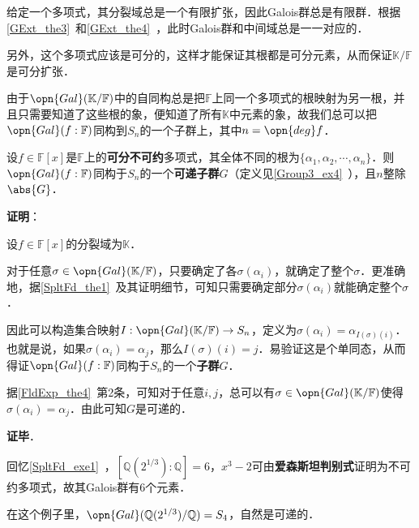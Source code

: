 给定一个多项式，其分裂域总是一个有限扩张，因此Galois群总是有限群．根据\autoref{GExt_the3}~和\autoref{GExt_the4}~，此时Galois群和中间域总是一一对应的．

另外，这个多项式应该是可分的，这样才能保证其根都是可分元素，从而保证$\mathbb{K}/\mathbb{F}$是可分扩张．

由于$\opn{Gal}(\mathbb{K}/\mathbb{F})$中的自同构总是把$\mathbb{F}$上同一个多项式的根映射为另一根，并且只需要知道了这些根的象，便知道了所有$\mathbb{K}$中元素的象，故我们总可以把$\opn{Gal}(f:\mathbb{F})$同构到$S_n$的一个子群上，其中$n=\opn{deg}f$．

\begin{theorem}{}\label{PlyRtS_the1}
设$f\in\mathbb{F}[x]$是$\mathbb{F}$上的\textbf{可分不可约}多项式，其全体不同的根为$\{\alpha_1, \alpha_2, \cdots, \alpha_n\}$．则$\opn{Gal}(f:\mathbb{F})$同构于$S_n$的一个\textbf{可递子群}$G$（定义见\autoref{Group3_ex4}~），且$n$整除$\abs{G}$．
\end{theorem}

\textbf{证明}：

设$f\in\mathbb{F}[x]$的分裂域为$\mathbb{K}$．

对于任意$\sigma\in\opn{Gal}(\mathbb{K}/\mathbb{F})$，只要确定了各$\sigma(\alpha_i)$，就确定了整个$\sigma$．更准确地，据\autoref{SpltFd_the1}~及其证明细节，可知只需要确定部分$\sigma(\alpha_i)$就能确定整个$\sigma$．

因此可以构造集合映射$I:\opn{Gal}(\mathbb{K}/\mathbb{F})\to S_n$，定义为$\sigma(\alpha_i)=\alpha_{I(\sigma)(i)}$．也就是说，如果$\sigma(\alpha_i)=\alpha_j$，那么$I(\sigma)(i)=j$．易验证这是个单同态，从而得证$\opn{Gal}(f:\mathbb{F})$同构于$S_n$的一个\textbf{子群}$G$．

据\autoref{FldExp_the4}~第2条，可知对于任意$i, j$，总可以有$\sigma\in\opn{Gal}(\mathbb{K}/\mathbb{F})$使得$\sigma(\alpha_i)=\alpha_j$．由此可知$G$是可递的．

\textbf{证毕}．


\begin{example}{}
回忆\autoref{SpltFd_exe1}~，$[\mathbb{Q}(2^{1/3}):\mathbb{Q}]=6$，$x^3-2$可由\textbf{爱森斯坦判别式}证明为不可约多项式，故其Galois群有6个元素．

在这个例子里，$\opn{Gal}(\mathbb{Q}(2^{1/3})/\mathbb{Q})=S_4$，自然是可递的．
\end{example}


